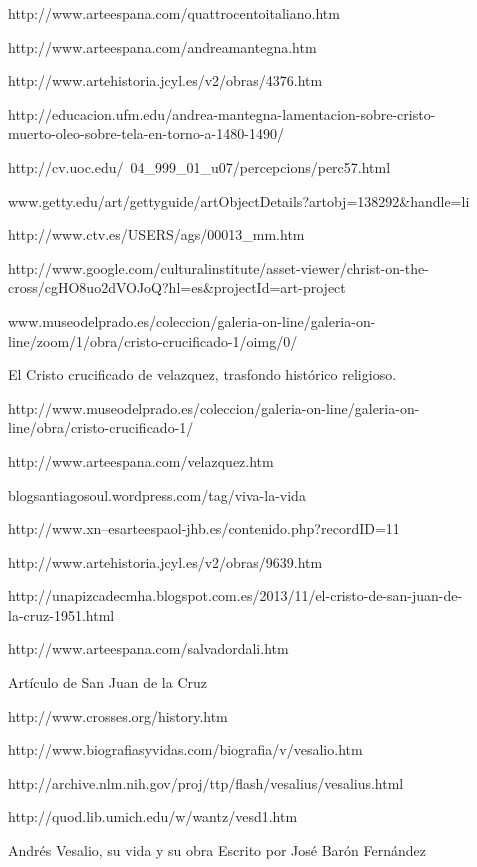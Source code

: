 \begin{description}
\item[] http://www.arteespana.com/quattrocentoitaliano.htm
\item[] http://www.arteespana.com/andreamantegna.htm
\item[] http://www.artehistoria.jcyl.es/v2/obras/4376.htm
\item[] http://educacion.ufm.edu/andrea-mantegna-lamentacion-sobre-cristo-muerto-oleo-sobre-tela-en-torno-a-1480-1490/
\item[] http://cv.uoc.edu/~04\_999\_01\_u07/percepcions/perc57.html

\item[] www.getty.edu/art/gettyguide/artObjectDetails?artobj=138292\&handle=li
\item[] http://www.ctv.es/USERS/ags/00013\_mm.htm
\item[] http://www.google.com/culturalinstitute/asset-viewer/christ-on-the-cross/cgHO8uo2dVOJoQ?hl=es\&projectId=art-project

\item[] www.museodelprado.es/coleccion/galeria-on-line/galeria-on-line/zoom/1/obra/cristo-crucificado-1/oimg/0/
\item[] El Cristo crucificado de velazquez, trasfondo histórico religioso. 
\item[] http://www.museodelprado.es/coleccion/galeria-on-line/galeria-on-line/obra/cristo-crucificado-1/
\item[] http://www.arteespana.com/velazquez.htm

\item[] blogsantiagosoul.wordpress.com/tag/viva-la-vida
\item[] http://www.xn--esarteespaol-jhb.es/contenido.php?recordID=11
\item[] http://www.artehistoria.jcyl.es/v2/obras/9639.htm
\item[] http://unapizcadecmha.blogspot.com.es/2013/11/el-cristo-de-san-juan-de-la-cruz-1951.html
\item[] http://www.arteespana.com/salvadordali.htm
\item[] Artículo de San Juan de la Cruz


\item[] http://www.crosses.org/history.htm

\item[] http://www.biografiasyvidas.com/biografia/v/vesalio.htm
\item[] http://archive.nlm.nih.gov/proj/ttp/flash/vesalius/vesalius.html
\item[] http://quod.lib.umich.edu/w/wantz/vesd1.htm
\item[] Andrés Vesalio, su vida y su obra Escrito por José Barón Fernández


\end{description}